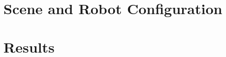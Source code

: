 \documentclass[10pt,journal,compsoc]{IEEEtran}
\begin{document}
%
%
%
%
%
%

\section{Scene and Robot Configuration}

\section{Results}
\end{document}
